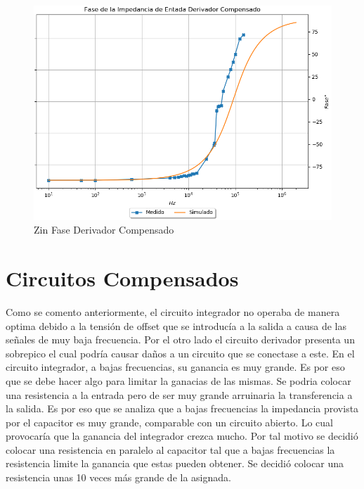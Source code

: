 \begin{figure}[H]
	\centering
	\includegraphics[width=\textwidth]{Ejercicio4/SUPERPOSICION-ZIN-DERIVADOR-COMPENSADO-FASE} 
	\caption{Zin Fase Derivador Compensado}
\end{figure}

\section{Circuitos Compensados}
Como se comento anteriormente, el circuito integrador no operaba de manera optima debido a la tensión de offset que se introducía a la salida a causa de las señales de muy baja frecuencia. Por el otro lado el circuito derivador presenta un sobrepico el cual podría causar daños a un circuito que se conectase a este. 
En el circuito integrador, a bajas frecuencias, su ganancia es muy grande. Es por eso que se debe hacer algo para limitar la ganacias de las mismas. Se podria colocar una resistencia a la entrada pero de ser muy grande arruinaria la transferencia a la salida. Es por eso que se analiza que a bajas frecuencias la impedancia provista por el capacitor es muy grande, comparable con un circuito abierto. Lo cual provocaría que la ganancia del integrador crezca mucho. Por tal motivo se decidió colocar una resistencia en paralelo al capacitor tal que a bajas frecuencias la resistencia limite la ganancia que estas pueden obtener. 
Se decidió colocar una resistencia unas 10 veces más grande de la asignada. 

